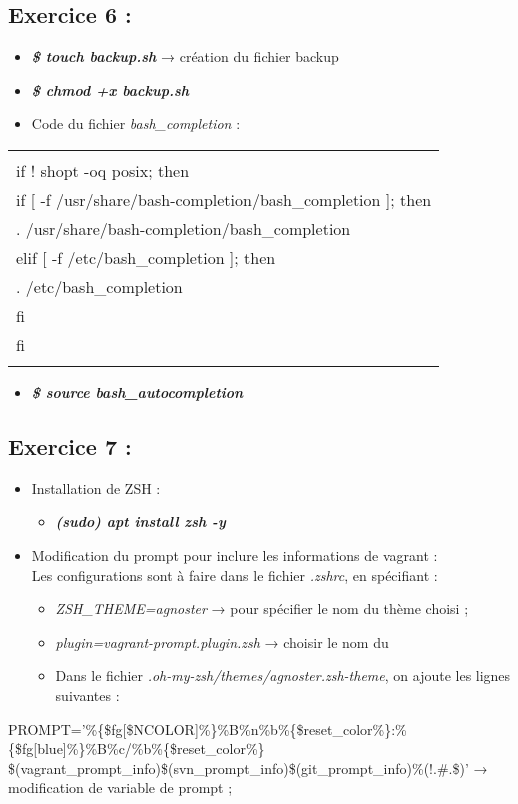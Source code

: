 \documentclass[a4paper]{article}
\begin{document}
\subsection{Exercice 6 : }

	\begin{itemize}
		\item \textbf{\textit{\$ touch backup.sh }}→ création du fichier backup
		\item \textbf{\textit{\$ chmod +x backup.sh}} 
		\item Code du fichier \textit{bash\_completion} : 
	\end{itemize}
	\begin{tabular}{|l|}
		\hline
			\hfill \break \\
			if ! shopt -oq posix; then \\
  			if [ -f /usr/share/bash-completion/bash\_completion ]; then \\
    				. /usr/share/bash-completion/bash\_completion \\
  			elif [ -f /etc/bash\_completion ]; then \\
    				. /etc/bash\_completion \\
  			fi \\
			fi \\
			\hfill		
		
	\end{tabular}
	\begin{itemize}
		\item \textbf{\textit{\$ source bash\_autocompletion}}
	\end{itemize}
	

\subsection{Exercice 7 : }
	\begin{itemize}
		\item Installation de ZSH :
			\begin{itemize}
				\item \textbf{\textit{(sudo) apt install zsh -y }}
			\end{itemize}
		\item Modification du prompt pour inclure les informations de vagrant : \\
		Les configurations sont à faire dans le fichier \textit{.zshrc}, en spécifiant : 
		\begin{itemize}
		 \item \textit{ZSH\_THEME=agnoster} → pour spécifier le nom du thème choisi ;
		 \item \textit{plugin=vagrant-prompt.plugin.zsh} → choisir le nom du 
		 \item Dans le fichier \textit{.oh-my-zsh/themes/agnoster.zsh-theme}, on ajoute les lignes suivantes : 
		\end{itemize}
	\end{itemize}
	PROMPT='\%\{\$fg[\$NCOLOR]\%\}\%B\%n\%b\%\{\$reset\_color\%\}:\%\{\$fg[blue]\%\}\%B\%c/\%b\%\{\$reset\_color\%\} \$(vagrant\_prompt\_info)\$(svn\_prompt\_info)\$(git\_prompt\_info)\%(!.\#.\$)' → modification de variable de prompt ;
	
\end{document}
